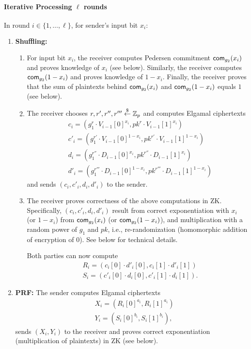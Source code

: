 \paragraph{Iterative Processing $\ell$ rounds}
In round $i\in\{1,\ldots,\ell\}$, for sender's input bit $x_i$:
\begin{enumerate}
\item {\bf Shuffling:}
\begin{enumerate}
\item   For input bit $x_i$, the receiver computes
  Pedersen commitment $\mathsf{com}_{g_2}(x_i)$ and proves knowledge of $x_i$
  (see below). Similarly, the receiver computes $\mathsf{com}_{g_2}(1-x_i)$
  and proves knowledge of $1-x_i$. Finally, the receiver proves that
  the sum of plaintexts behind $\mathsf{com}_{g_2}(x_i)$ and
  $\mathsf{com}_{g_2}(1-x_i)$ equals $1$ (see below).


\item  The receiver chooses $r,r',r'',r'''\stackrel{\$}{\leftarrow}\mathbb{Z}_p$ and computes Elgamal ciphertexts
  \begin{align*}
    &c_i=(g_1^r\cdot{}V_{i-1}[0]^{x_i},pk^{r}\cdot{}V_{i-1}[1]^{x_i})
    \\&c'_i=(g_1^{r'}\cdot{}V_{i-1}[0]^{1-x_i},pk^{r'}\cdot{}V_{i-1}[1]^{1-x_i})
    \\&d_i=(g_1^{r''}\cdot{}D_{i-1}[0]^{x_i},pk^{r''}\cdot{}D_{i-1}[1]^{x_i})
    \\&d'_i=(g_1^{r'''}\cdot{}D_{i-1}[0]^{1-x_i},pk^{r'''}\cdot{}D_{i-1}[1]^{1-x_i})%
  \end{align*}
  and sends $(c_i,c'_i,d_i,d'_i)$ to the sender.

\item The receiver proves correctness of the above computations in
  ZK. Specifically, $(c_i,c'_i,d_i,d'_i)$ result from correct
  exponentiation with $x_i$ (or $1-x_i$) from $\mathsf{com}_{g_2}(x_i)$ (or
  $\mathsf{com}_{g_2}(1-x_i)$), and multiplication with a random power of
  $g_1$ and $pk$, i.e., re-randomization (homomorphic addition of
  encryption of $0$).  See below for technical details.

   Both parties can now compute
    \begin{align*}&R_i=(c_i[0]\cdot{}d'_i[0],c_i[1]\cdot{}d'_i[1])
    \\&S_i=(c'_i[0]\cdot{}d_i[0],c'_i[1]\cdot{}d_i[1]).
    \end{align*}
   
  \end{enumerate}

\item {\bf PRF:} The sender computes Elgamal ciphertexts
  \begin{align*}
&X_i=(R_i[0]^{a_i},R_i[1]^{a_i})
\\&Y_i=(S_i[0]^{b_i},S_i[1]^{b_i}),
  \end{align*}
sends $(X_i,Y_i)$ to the receiver and proves correct exponentiation
(multiplication of plaintexts) in ZK (see below).


\end{enumerate}
